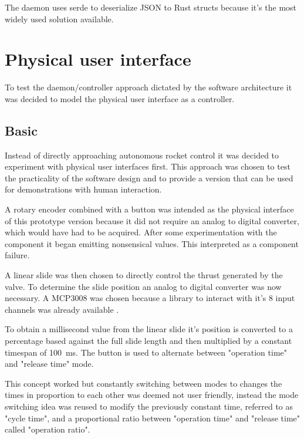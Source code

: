 The daemon uses serde \cite{serde} to deserialize JSON to Rust structs because it's the most widely used solution available.

\section{Physical user interface}
\author{Sebastian Schaffler}

To test the daemon/controller approach dictated by the software architecture it was decided to model the physical user interface as a controller.

\subsection{Basic}
Instead of directly approaching autonomous rocket control it was decided to experiment with physical user interfaces first. This approach was chosen to test the practicality of the software design and to provide a version that can be used for demonstrations with human interaction. 

A rotary encoder \cite{rotary-encoder} combined with a button was intended as the physical interface of this prototype version because it did not require an analog to digital converter, which would have had to be acquired. After some experimentation with the component it began emitting nonsensical values. This interpreted as a component failure. 

A linear slide was then chosen to directly control the thrust generated by the valve. To determine the slide position an analog to digital converter was now necessary. A MCP3008 \cite{mcp3008} was chosen because a library \cite{mcp3008-library} to interact with it's 8 input channels was already available . 

To obtain a millisecond value from the linear slide it's position is converted to a percentage based against the full slide length and then multiplied by a constant timespan of \SI{100}{\milli\second}. The button is used to alternate between "operation time" and "release time" mode. 

This concept worked but constantly switching between modes to changes the times in proportion to each other was deemed not user friendly, instead the mode switching idea was reused to modify the previously constant time, referred to as "cycle time", and a proportional ratio between "operation time" and "release time" called "operation ratio".

